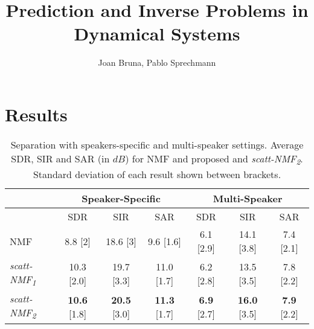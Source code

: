 \documentclass[11pt]{article} %
\title{Prediction and Inverse Problems in Dynamical Systems}
\author{Joan Bruna, Pablo Sprechmann}
\begin{document}
\maketitle


\section{Results}

\begin{table*}[t]
\centering
\begin{tabular}{l|c|c|c || c |c |c }
  \hline\hline
  & \multicolumn{3}{c||}{Speaker-Specific} & \multicolumn{3}{c}{Multi-Speaker} \\
  \hline
 & SDR & SIR & SAR & SDR & SIR & SAR\\
\hline
NMF  &8.8 [2] & 18.6 [3] &   9.6 [1.6] & 6.1 [2.9] &   14.1 [3.8] & 7.4 [2.1] \\
\hline
\emph{scatt-NMF\textsubscript{1}} & 10.3 [2.0]  & 19.7 [3.3]  & 11.0 [1.7] &  6.2 [2.8] &   13.5 [3.5] & 7.8 [2.2] \\
\emph{scatt-NMF\textsubscript{2}} &  {\bf 10.6} [1.8] & {\bf 20.5} [3.0]  & {\bf 11.3} [1.7]  &  {\bf 6.9} [2.7] & {\bf 16.0} [3.5]  & {\bf 7.9} [2.2] \\
  \hline
  \hline
\end{tabular}
\caption{Separation with speakers-specific and multi-speaker settings. Average SDR, SIR and SAR (in $dB$) for NMF and proposed  and \emph{scatt-NMF\textsubscript{2}}. Standard deviation of each result shown between brackets. \label{ta:eval}}
\vspace{-2ex}
\end{table*}
\end{document}
